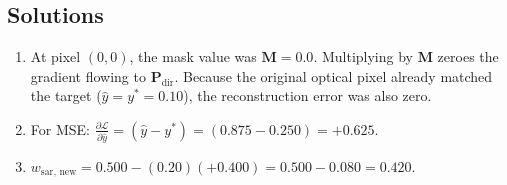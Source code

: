 \subsection*{Solutions}
\begin{enumerate}
    \item At pixel $(0, 0)$, the mask value was $\mathbf{M} = 0.0$. Multiplying by $\mathbf{M}$ zeroes the gradient flowing to $\mathbf{P}_{\text{dir}}$. Because the original optical pixel already matched the target ($\hat{y} = y^* = 0.10$), the reconstruction error was also zero.
    \item For MSE: $\frac{\partial \mathcal{L}}{\partial \hat{y}} = (\hat{y} - y^*) = (0.875 - 0.250) = \mathbf{+0.625}$.
    \item $w_{\text{sar, new}} = 0.500 - (0.20)(+0.400) = 0.500 - 0.080 = \mathbf{0.420}$.
\end{enumerate}
